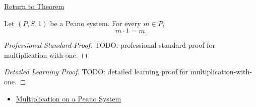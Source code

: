 \newpage
{}
\label{prf:multiplication-with-one}

\begin{remark*}[Return]
\hyperref[thm:multiplication-with-one]{Return to Theorem}
\end{remark*}

\begin{theorem*}
Let $(P,S,1)$ be a Peano system. For every $m \in P$,
\[
m \cdot 1 = m.
\]
\end{theorem*}

\begin{proof}[Professional Standard Proof]
\LRAProofBodyStart
TODO: professional standard proof for multiplication-with-one.
\end{proof}

\begin{proof}[Detailed Learning Proof]
\LRAProofBodyStart
TODO: detailed learning proof for multiplication-with-one.
\end{proof}

\begin{remark*}
\end{remark*}

\begin{dependencies}
\begin{itemize}
  \item \hyperref[def:multiplication-on-peano-system]{Multiplication on a Peano System}
\end{itemize}
\end{dependencies}

\clearpage
